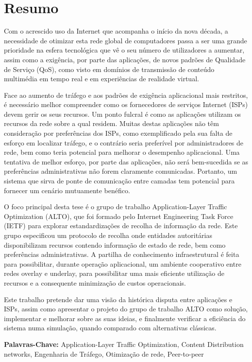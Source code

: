 \chapter{Resumo}

    Com o acrescido uso da Internet que acompanha o início da nova década, a necessidade de otimizar esta rede global de computadores passa a ser uma grande prioridade na esfera tecnológica que vê o seu número de utilizadores a aumentar, assim como a exigência, por parte das aplicações, de novos padrões de Qualidade de Serviço (QoS), como visto em domínios de transmissão de conteúdo multimédia em tempo real e em experiências de realidade virtual.

    Face ao aumento de tráfego e aos padrões de exigência aplicacional mais restritos, é necessário melhor compreender como os fornecedores de serviços Internet (ISPs) devem gerir os seus recursos.
    Um ponto fulcral é como as aplicações utilizam os recursos da rede sobre a qual residem.
    Muitas destas aplicações não têm consideração por preferências dos ISPs, como exemplificado pela sua falta de esforço em localizar tráfego, e o contrário seria preferível por administradores de rede, bem como teria potencial para melhorar o desempenho aplicacional.
    Uma tentativa de melhor esforço, por parte das aplicações, não será bem-sucedida se as preferências administrativas não forem claramente comunicadas.
    Portanto, um sistema que sirva de ponte de comunicação entre camadas tem potencial para fornecer um cenário mutuamente benéfico.

    O foco principal desta tese é o grupo de trabalho Application-Layer Traffic Optimization (ALTO), que foi formado pelo Internet Engineering Task Force (IETF) para explorar estandardizações de recolha de informação da rede. 
    Este grupo especificou um protocolo de recolha onde entidades autoritárias disponibilizam recursos contendo informação de estado de rede, bem como preferências administrativas. 
    A partilha de conhecimento infraestrutural é feita para possibilitar, durante operação aplicacional, um ambiente cooperativo entre redes overlay e underlay, para possibilitar uma mais eficiente utilização de recursos e a consequente minimização de custos operacionais.

    Este trabalho pretende dar uma visão da histórica disputa entre aplicações e ISPs, assim como apresentar o projeto do grupo de trabalho ALTO como solução, implementar e melhorar sobre as suas ideias, e finalmente verificar a eficiência do sistema numa simulação, quando comparado com alternativas clássicas.

    \medskip

    \textbf{Palavras-Chave:} Application-Layer Traffic Optimization, Content Distribution networks, Engenharia de Tráfego, Otimização de rede, Peer-to-peer
